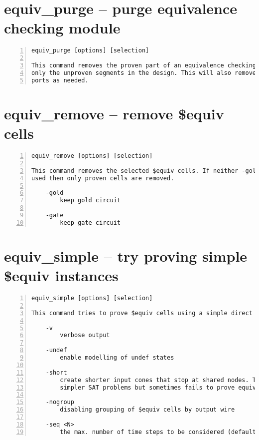 \section{equiv\_purge -- purge equivalence checking module}
\label{cmd:equiv_purge}
\begin{lstlisting}[numbers=left,frame=single]
    equiv_purge [options] [selection]

This command removes the proven part of an equivalence checking module, leaving
only the unproven segments in the design. This will also remove and add module
ports as needed.
\end{lstlisting}

\section{equiv\_remove -- remove \$equiv cells}
\label{cmd:equiv_remove}
\begin{lstlisting}[numbers=left,frame=single]
    equiv_remove [options] [selection]

This command removes the selected $equiv cells. If neither -gold nor -gate is
used then only proven cells are removed.

    -gold
        keep gold circuit

    -gate
        keep gate circuit
\end{lstlisting}

\section{equiv\_simple -- try proving simple \$equiv instances}
\label{cmd:equiv_simple}
\begin{lstlisting}[numbers=left,frame=single]
    equiv_simple [options] [selection]

This command tries to prove $equiv cells using a simple direct SAT approach.

    -v
        verbose output

    -undef
        enable modelling of undef states

    -short
        create shorter input cones that stop at shared nodes. This yields
        simpler SAT problems but sometimes fails to prove equivalence.

    -nogroup
        disabling grouping of $equiv cells by output wire

    -seq <N>
        the max. number of time steps to be considered (default = 1)
\end{lstlisting}

